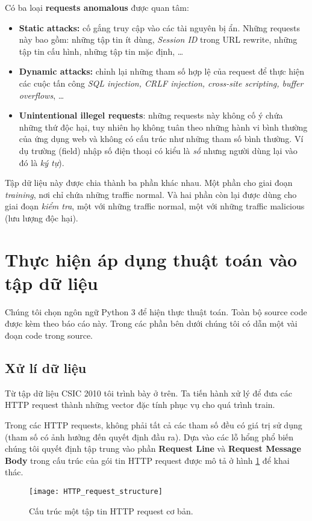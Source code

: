 \documentclass[../main-report.tex]{subfiles}
\begin{document}
Có ba loại \textbf{requests anomalous} được quan tâm:

\begin{itemize}
\item \textbf{Static attacks:} cố gắng truy cập vào các tài nguyên bị ẩn. Những requests này bao gồm: những tập tin ít dùng, \emph{Session ID} trong URL rewrite, những tập tin cấu hình, những tập tin mặc định, \ldots
\item \textbf{Dynamic attacks:} chỉnh lại những tham số hợp lệ của request để thực hiện các cuộc tấn công \emph{SQL injection, CRLF injection, cross-site scripting,  buffer overflows}, \ldots
\item \textbf{Unintentional illegel requests}: những requests này không cố ý chứa những thứ độc hại, tuy nhiên họ không tuân theo những hành vi bình thường của ứng dụng web và không có cấu trúc như những tham số bình thường. Ví dụ trường (field) nhập số điện thoại có kiểu là \emph{số} nhưng người dùng lại vào đó là \emph{ký tự}).
\end{itemize}

Tập dữ liệu này được chia thành ba phần khác nhau. Một phần cho giai đoạn \emph{training}, nơi chỉ chứa những traffic normal. Và hai phần còn lại được dùng cho giai đoạn \emph{kiểm tra}, một với những traffic normal, một với những traffic malicious (lưu lượng độc hại).

\section{Thực hiện áp dụng thuật toán vào tập dữ liệu}
Chúng tôi chọn ngôn ngữ Python 3 để hiện thực thuật toán. Toàn bộ source code được kèm theo báo cáo này. Trong các phần bên dưới chúng tôi có dẫn một vài đoạn code trong source.
\subsection{Xử lí dữ liệu}
Từ tập dữ liệu CSIC 2010 tôi trình bày ở trên. Ta tiến hành xử lý để đưa các HTTP request thành những vector đặc tính phục vụ cho quá trình train.

Trong các HTTP requests, không phải tất cả các tham số đều có giá trị sử dụng (tham số có ảnh hưởng đến quyết định đầu ra). Dựa vào các lỗ hổng phổ biến chúng tôi quyết định tập trung vào phần \textbf{Request Line} và \textbf{Request Message Body} trong cấu trúc của gói tin HTTP request được mô tả ở hình \ref{fig:http_req_struct} để khai thác.

\begin{figure}[ht!]
\centering\texttt{[image: HTTP\_request\_structure]}
\caption{Cấu trúc một tập tin HTTP request cơ bản.}
\label{fig:http_req_struct}
\end{figure}
\end{document}
